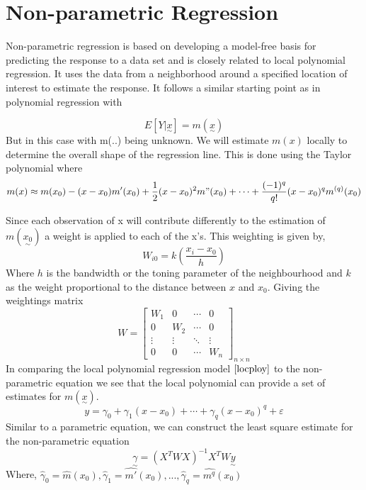 \documentclass[12pt]{report}
\begin{document}
\section{Non-parametric Regression}
Non-parametric regression is based on developing a model-free basis for predicting the response to a data set and is closely related to local polynomial regression. It uses the data from a neighborhood around a specified location of interest to estimate the response. It follows a similar starting point as in polynomial regression with

\begin{equation}
    E[Y|\underset{\sim}{x}] = m(\underset{\sim}{x})
    \label{nonparam}
\end{equation}
But in this case with m(..) being unknown. We will estimate $m(x)$ locally to determine the overall shape of the regression line. This is done using the Taylor polynomial where 
\begin{equation}
    \small{m(x) \approx m(x_0) - (x-x_{0})m'(x_0)+ \frac{1}{2}(x-x_{0})^{2}m"(x_0) +\cdots+\frac{(-1)^q}{q!}(x-x_0)^qm^{(q)}(x_0)}
\end{equation}

Since each observation of x will contribute differently to the estimation of $m(\underset{\sim}{x_{0}})$ a weight is applied to each of the x's. This weighting is given by,
\begin{equation}
    W_{i0} = k(\frac{x_{i}-x_0}{h})
\end{equation}
Where $h$ is the bandwidth or the toning parameter of the neighbourhood and $k$ as the weight proportional to the distance between $x$ and $x_0$. Giving the weightings matrix 
\begin{equation}
W = 
    \begin{bmatrix}
    W_1      & 0     & \cdots & 0\\
    0 & W_2          & \cdots & 0\\
    \vdots & \vdots     & \ddots      & \vdots\\
    0 & 0     & \cdots & W_n
\end{bmatrix}_{n\times n}
\end{equation}
In comparing the local polynomial regression model $\eqref{locploy}$ to the non-parametric equation we see that the local polynomial can provide a set of estimates for $m(\underset{\sim}x)$. 
\begin{equation} \label{locploy}
    y = \gamma_0+\gamma_1(x-x_0)+\cdots+\gamma_q(x-x_0)^q+\varepsilon
\end{equation}
Similar to a parametric equation, we can construct the least square estimate for the non-parametric equation
\begin{equation}
        \underset{\sim}{\gamma} = (X^TWX)^{-1}X^TW\underset{\sim}{y}
\end{equation}
Where, $\hat{\gamma}_0 = \hat{m}(x_0), \hat{\gamma}_1 = \hat{m'}(x_0), ...   , \hat{\gamma}_q = \hat{m^{q}}(x_0)$
\end{document}
